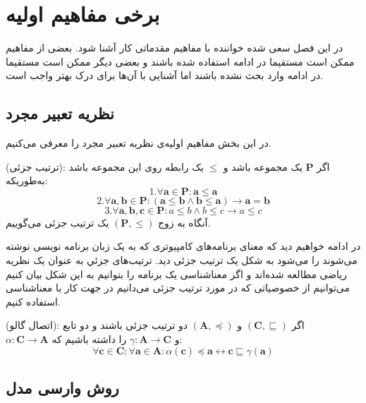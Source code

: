 \pagestyle{plain}
\setcounter{page}{1}

\chapter{برخی مفاهیم اولیه}
در این فصل سعی شده خواننده با مفاهیم مقدماتی کار آشنا شود. بعضی از مفاهیم ممکن است مستقیما در ادامه استفاده شده باشند و بعضی دیگر ممکن است مستقیما در ادامه وارد بحث نشده باشند اما آشنایی با آن‌ها برای درک بهتر واجب است.
\section{نظریه تعبیر مجرد}

در این بخش مفاهیم اولیه‌ی نظریه تعبیر مجرد را معرفی می‌کنیم.\\

\begin{defn}
	(ترتیب جزئی):
	اگر 
	$\mathbf{P}$
	یک مجموعه باشد و 
	$\mathbb{\leq}$
	یک رابطه روی این مجموعه باشد به‌طوریکه:
	$$
	1.\forall \mathbf{a} \in \mathbf{P}: \mathbf{a\leq a}$$
	$$2.\forall \mathbf{a,b} \in \mathbf{P}: (\mathbf{a \leq b \land b \leq a}) \rightarrow
	\mathbf{a=b} $$ 
	$$3.\forall \mathbf{a,b,c} \in \mathbf{P}: a \leq b \land b \leq c \rightarrow a \leq c$$
	آنگاه به زوج 
	$(\mathbf{P},\leq)$
	یک ترتیب جزئی می‌گوییم.
	
\end{defn}

در ادامه خواهیم دید که معنای برنامه‌های کامپیوتری که به یک زبان برنامه نویسی نوشته می‌شوند را می‌شود به شکل یک ترتیب جزئی دید. ترتیب‌های جزئي به عنوان یک نظریه ریاضی مطالعه شده‌اند و اگر معناشناسی یک برنامه را بتوانیم به این شکل بیان کنیم می‌توانیم از خصوصیاتی که در مورد ترتیب جزئی می‌دانیم در جهت کار با معناشناسی استفاده کنیم. 

\begin{defn}
	(اتصال گالو):
	اگر 
	$(\mathbf{C},\sqsubseteq)$
	و
	$(\mathbf{A},\preceq)$
	دو ترتیب جزئی باشند و دو تابع \\
	$\alpha : \mathbf{C \rightarrow A}$
	و
	$\gamma : \mathbf{A \rightarrow C}$
	را داشته باشیم که:
	$$
	\forall \mathbf{c \in C}: \forall \mathbf{a \in A}: 
	\alpha(\mathbf{c}) \preceq \mathbf{a} \leftrightarrow 
	\mathbf{c} \sqsubseteq \gamma(\mathbf{a})
	$$
\end{defn}


\section{روش وارسی مدل}

